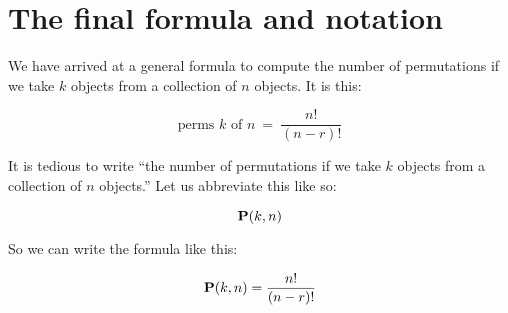 \documentclass[../../../main.tex]{subfiles}
\begin{document}
\section{The final formula and notation}

We have arrived at a general formula to compute the number of permutations if we take $k$ objects from a collection of $n$ objects. It is this:

\begin{equation*}
  \text{perms $k$ of $n$}~=~\frac{n!}{(n - r)!}
\end{equation*}

\noindent
It is tedious to write ``the number of permutations if we take $k$ objects from a collection of $n$ objects.'' Let us abbreviate this like so:

\begin{equation*}
  \mathbf{P}(k, n)
\end{equation*}

\noindent
So we can write the formula like this:

\begin{equation*}
  \mathbf{P}(k, n) = \frac{n!}{(n - r)!}
\end{equation*}
\end{document}
